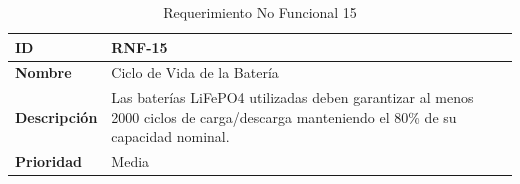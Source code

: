 \begin{table}[H]
\centering
\begin{tabular}{|l|p{10cm}|}
\hline
\textbf{ID} & RNF-15 \\ \hline
\textbf{Nombre} & Ciclo de Vida de la Batería \\ \hline
\textbf{Descripción} & Las baterías LiFePO4 utilizadas deben garantizar al menos 2000 ciclos de carga/descarga manteniendo el 80\% de su capacidad nominal. \\ \hline
\textbf{Prioridad} & Media \\ \hline
\end{tabular}
\caption{Requerimiento No Funcional 15}
\end{table}
